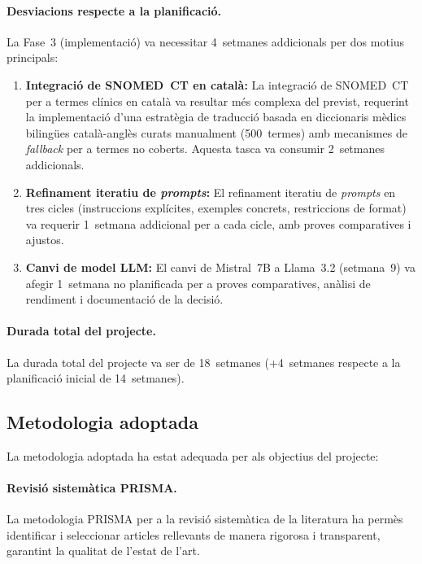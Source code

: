 \documentclass[CAT]{TFUOC}%
\begin{document}
\paragraph{Desviacions respecte a la planificació.}
La Fase~3 (implementació) va necessitar 4~setmanes addicionals per dos motius principals:

\begin{enumerate}
    \item \textbf{Integració de SNOMED~CT en català:} La integració de SNOMED~CT per a termes clínics en català va resultar més complexa del previst, requerint la implementació d'una estratègia de traducció basada en diccionaris mèdics bilingües català-anglès curats manualment (500~termes) amb mecanismes de \textit{fallback} per a termes no coberts. Aquesta tasca va consumir 2~setmanes addicionals.
    
    \item \textbf{Refinament iteratiu de \textit{prompts}:} El refinament iteratiu de \textit{prompts} en tres cicles (instruccions explícites, exemples concrets, restriccions de format) va requerir 1~setmana addicional per a cada cicle, amb proves comparatives i ajustos.
    
    \item \textbf{Canvi de model LLM:} El canvi de Mistral~7B a Llama~3.2 (setmana~9) va afegir 1~setmana no planificada per a proves comparatives, anàlisi de rendiment i documentació de la decisió.
\end{enumerate}

\paragraph{Durada total del projecte.}
La durada total del projecte va ser de 18~setmanes (+4~setmanes respecte a la planificació inicial de 14~setmanes).

\subsection{Metodologia adoptada}

La metodologia adoptada ha estat adequada per als objectius del projecte:

\paragraph{Revisió sistemàtica PRISMA.}
La metodologia PRISMA per a la revisió sistemàtica de la literatura ha permès identificar i seleccionar articles rellevants de manera rigorosa i transparent, garantint la qualitat de l'estat de l'art.
\end{document}
